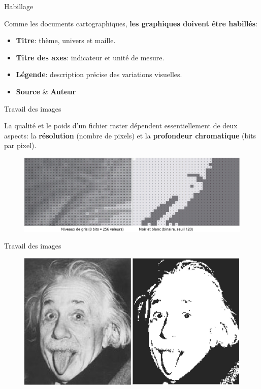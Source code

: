\begin{frame}{Habillage}

Comme les documents cartographiques, \textbf{les graphiques doivent être habillés}:

\begin{itemize}
  \item \textbf{Titre}: thème, univers et maille. \\ 
  \item \textbf{Titre des axes}: indicateur et unité de mesure. \\
  \item \textbf{Légende}: description précise des variations visuelles. \\
  \item \textbf{Source} \& \textbf{Auteur}
\end{itemize}

\end{frame}


\begin{frame}{Travail des images}

La qualité et le poids d'un fichier raster dépendent essentiellement de deux aspects: la \textbf{résolution} (nombre de pixels) et la \textbf{profondeur chromatique} (bits par pixel).

\begin{figure}
\includegraphics[width=12cm]{EinsteinZoom.jpg}
\end{figure}

\end{frame}


\begin{frame}{Travail des images}

\begin{figure}
\includegraphics[width=12cm]{Einstein.jpg}
\end{figure}

\end{frame}


